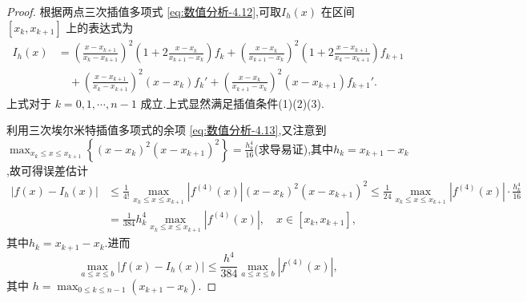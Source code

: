 \documentclass[../../main.tex]{subfiles}
\begin{document}
\begin{proof}
根据两点三次插值多项式 \eqref{eq:数值分析-4.12},可取$I_h(x)$ 在区间 $[x_k, x_{k + 1}]$ 上的表达式为
\begin{align*}
I_h(x) &= \left( \frac{x - x_{k + 1}}{x_k - x_{k + 1}} \right)^2 \left( 1 + 2 \frac{x - x_k}{x_{k + 1} - x_k} \right) f_k + \left( \frac{x - x_k}{x_{k + 1} - x_k} \right)^2 \left( 1 + 2 \frac{x - x_{k + 1}}{x_k - x_{k + 1}} \right) f_{k + 1} \\
&\quad + \left( \frac{x - x_{k + 1}}{x_k - x_{k + 1}} \right)^2 (x - x_k) f_k' + \left( \frac{x - x_k}{x_{k + 1} - x_k} \right)^2 (x - x_{k + 1}) f_{k + 1}'.
\end{align*}
上式对于 $k = 0, 1, \cdots, n - 1$ 成立.上式显然满足插值条件(1)(2)(3).

利用三次埃尔米特插值多项式的余项 \eqref{eq:数值分析-4.13},又注意到$\max_{x_k\leqslant x\leqslant x_{k+1}} \left\{ (x-x_k)^2(x-x_{k+1})^2 \right\} =\frac{h_{k}^{4}}{16}$(求导易证),其中$h_k = x_{k + 1} - x_k$,故可得误差估计
\begin{align*}
|f(x)-I_h(x)|&\leqslant \frac{1}{4!}\max_{x_k\leqslant x\leqslant x_{k+1}} |f^{(4)}(x)|(x-x_k)^2(x-x_{k+1})^2\leqslant \frac{1}{24}\max_{x_k\leqslant x\leqslant x_{k+1}} |f^{(4)}(x)|\cdot \frac{h_{k}^{4}}{16}
\\
&=\frac{1}{384}h_{k}^{4}\max_{x_k\leqslant x\leqslant x_{k+1}} |f^{(4)}(x)|,\quad x\in [x_k,x_{k+1}],
\end{align*}
其中$h_k = x_{k + 1} - x_k$.进而
\[
\max_{a \leqslant x \leqslant b} | f(x) - I_h(x) | \leqslant \frac{h^4}{384} \max_{a \leqslant x \leqslant b} | f^{(4)}(x) |,
\]
其中 $h = \max_{0 \leqslant k \leqslant n - 1} (x_{k + 1} - x_k)$.

\end{proof}
\end{document}
